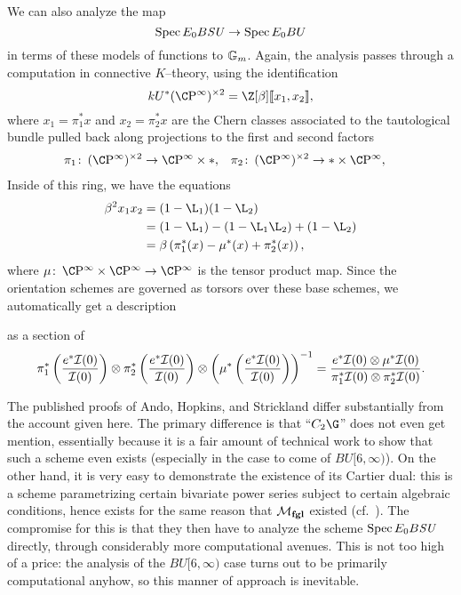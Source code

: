 \begin{remark}\label{BSUToBU}
We can also analyze the map \[\operatorname{Spec} E_0 B\mathit{SU} \to \operatorname{Spec} E_0 BU\] in terms of these models of functions to \(\mathbb G_m\).  Again, the analysis passes through a computation in connective \(K\)--theory, using the identification \[kU^*(\CP^\infty)^{\times 2} = \Z[\beta]\ps{x_1, x_2},\] where \(x_1 = \pi_1^* x\) and \(x_2 = \pi_2^* x\) are the Chern classes associated to the tautological bundle pulled back along projections to the first and second factors
\begin{align*}
\pi_1\co (\CP^\infty)^{\times 2} & \to \CP^\infty \times *, &
\pi_2\co (\CP^\infty)^{\times 2} & \to * \times \CP^\infty,
\end{align*}
Inside of this ring, we have the equations
\begin{align*}
\beta^2 x_1 x_2 & = (1 - \L_1)(1 - \L_2) \\
& = (1 - \L_1) - (1 - \L_1 \L_2) + (1 - \L_2) \\
& = \beta\left(\pi_1^*(x) - \mu^*(x) + \pi_2^*(x) \right),
\end{align*}
where \(\mu\co \CP^\infty \times \CP^\infty \to \CP^\infty\) is the tensor product map.  Since the orientation schemes are governed as torsors over these base schemes, we automatically get a description
\begin{center}
\end{center}
as a section of
\[\pi_1^* \left(\frac{e^* \mathcal{I}(0)}{\mathcal{I}(0)}\right) \otimes \pi_2^* \left(\frac{e^* \mathcal{I}(0)}{\mathcal{I}(0)}\right) \otimes \left(\mu^* \left(\frac{e^* \mathcal{I}(0)}{\mathcal{I}(0)}\right) \right)^{-1} = \frac{e^* \mathcal{I}(0) \otimes \mu^* \mathcal{I}(0)}{\pi_1^* \mathcal{I}(0) \otimes \pi_2^* \mathcal{I}(0)}.\]
\end{remark}

\begin{remark}\label{CUpper3Exists}
The published proofs of Ando, Hopkins, and Strickland differ substantially from the account given here.  The primary difference is that ``\(C_2 \G\)'' does not even get mention, essentially because it is a fair amount of technical work to show that such a scheme even exists (especially in the case to come of \(BU[6, \infty)\)).  On the other hand, it is very easy to demonstrate the existence of its Cartier dual: this is a scheme parametrizing certain bivariate power series subject to certain algebraic conditions, hence exists for the same reason that \(\mathcal{M}_{\mathbf{fgl}}\) existed (cf.\ ).  The compromise for this is that they then have to analyze the scheme \(\operatorname{Spec} E_0 B\mathit{SU}\) directly, through considerably more computational avenues.  This is not too high of a price: the analysis of the \(BU[6, \infty)\) case turns out to be primarily computational anyhow, so this manner of approach is inevitable.
\end{remark}

